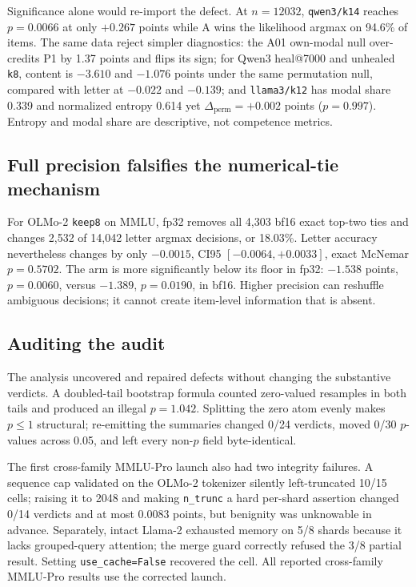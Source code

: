 Significance alone would re-import the defect. At $n=12032$, \texttt{qwen3/k14} reaches $p=0.0066$ at only $+0.267$ points while A wins the likelihood argmax on 94.6\% of items. The same data reject simpler diagnostics: the A01 own-modal null over-credits P1 by 1.37 points and flips its sign; for Qwen3 heal@7000 and unhealed \texttt{k8}, content is $-3.610$ and $-1.076$ points under the same permutation null, compared with letter at $-0.022$ and $-0.139$; and \texttt{llama3/k12} has modal share 0.339 and normalized entropy 0.614 yet $\Delta_{\mathrm{perm}}=+0.002$ points ($p=0.997$). Entropy and modal share are descriptive, not competence metrics.



\subsection{Full precision falsifies the numerical-tie mechanism}

For OLMo-2 \texttt{keep8} on MMLU, fp32 removes all 4,303 bf16 exact top-two ties and changes 2,532 of 14,042 letter argmax decisions, or 18.03\%. Letter accuracy nevertheless changes by only $-0.0015$, CI95 $[-0.0064,+0.0033]$, exact McNemar $p=0.5702$. The arm is more significantly below its floor in fp32: $-1.538$ points, $p=0.0060$, versus $-1.389$, $p=0.0190$, in bf16. Higher precision can reshuffle ambiguous decisions; it cannot create item-level information that is absent.

\subsection{Auditing the audit}

The analysis uncovered and repaired defects without changing the substantive verdicts. A doubled-tail bootstrap formula counted zero-valued resamples in both tails and produced an illegal $p=1.042$. Splitting the zero atom evenly makes $p\leq1$ structural; re-emitting the summaries changed 0/24 verdicts, moved 0/30 $p$-values across 0.05, and left every non-$p$ field byte-identical.

The first cross-family MMLU-Pro launch also had two integrity failures. A sequence cap validated on the OLMo-2 tokenizer silently left-truncated 10/15 cells; raising it to 2048 and making \texttt{n\_trunc} a hard per-shard assertion changed 0/14 verdicts and at most 0.0083 points, but benignity was unknowable in advance. Separately, intact Llama-2 exhausted memory on 5/8 shards because it lacks grouped-query attention; the merge guard correctly refused the 3/8 partial result. Setting \texttt{use\_cache=False} recovered the cell. All reported cross-family MMLU-Pro results use the corrected launch.
